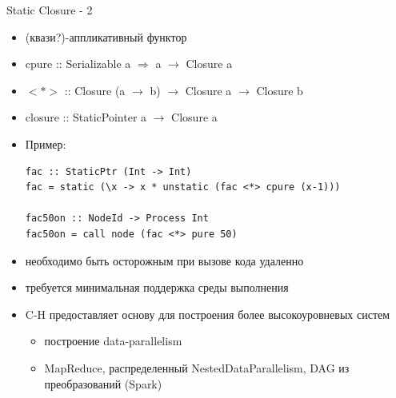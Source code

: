 \documentclass{beamer}
\begin{document}
\begin{frame}[fragile]{Static Closure - 2}
  \begin{itemize}
    \item (квази?)-аппликативный функтор
    \item \alert{c}pure :: \alert{Serializable a $\Rightarrow$} a $\rightarrow$ Closure a
    \item $<*>$ :: Closure (a $\rightarrow$ b) $\rightarrow$ Closure a $\rightarrow$ Closure b
    \item closure :: StaticPointer a $\rightarrow$ Closure a
    \item Пример:
\begin{verbatim}
fac :: StaticPtr (Int -> Int)
fac = static (\x -> x * unstatic (fac <*> cpure (x-1)))

fac50on :: NodeId -> Process Int
fac50on = call node (fac <*> pure 50)
\end{verbatim}
  \end{itemize}
\end{frame}

\begin{frame}
  \begin{itemize}
    \item необходимо быть осторожным при вызове кода удаленно
    \item требуется минимальная поддержка среды выполнения
    \item C-H предоставляет основу для построения более высокоуровневых систем
    \begin{itemize}
      \item построение data-parallelism 
      \item MapReduce, распределенный NestedDataParallelism, DAG из преобразований (Spark)
    \end{itemize}
  \end{itemize}
\end{frame}
\end{document}
